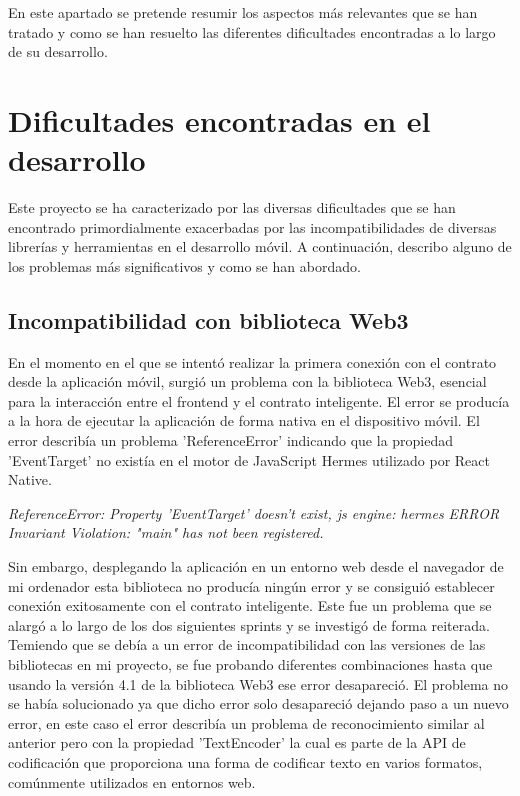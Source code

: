 
En este apartado se pretende resumir los aspectos más relevantes que se han tratado y como se han resuelto las diferentes dificultades encontradas a lo largo de su desarrollo.



\section{Dificultades encontradas en el desarrollo}

Este proyecto se ha caracterizado por las diversas dificultades que se han encontrado primordialmente exacerbadas por las incompatibilidades de diversas librerías y herramientas en el desarrollo móvil.
A continuación, describo alguno de los problemas más significativos y como se han abordado.

\subsection{Incompatibilidad con biblioteca Web3}

En el momento en el que se intentó realizar la primera conexión con el contrato desde la aplicación móvil, surgió un problema con la biblioteca Web3, esencial para la interacción entre el frontend y el contrato inteligente.
El error se producía a la hora de ejecutar la aplicación de forma nativa en el dispositivo móvil.
El error describía un problema 'ReferenceError' indicando que la propiedad 'EventTarget' no existía en el motor de JavaScript Hermes utilizado por React Native. 

\textit{ReferenceError: Property 'EventTarget' doesn't exist, js engine: hermes ERROR Invariant Violation: "main" has not been registered.}

Sin embargo, desplegando la aplicación en un entorno web desde el navegador de mi ordenador esta biblioteca no producía ningún error y se consiguió establecer conexión exitosamente con el contrato inteligente.
Este fue un problema que se alargó a lo largo de los dos siguientes sprints y se investigó de forma reiterada. Temiendo que se debía a un error de incompatibilidad con las versiones de las bibliotecas en mi proyecto, se fue probando diferentes combinaciones hasta que usando la versión 4.1 de la biblioteca Web3 ese error desapareció.
El problema no se había solucionado ya que dicho error solo desapareció dejando paso a un nuevo error, en este caso el error describía un problema de reconocimiento similar al anterior pero con la propiedad 'TextEncoder' la cual es parte de la API de codificación que proporciona una forma de codificar texto en varios formatos, comúnmente utilizados en entornos web.

